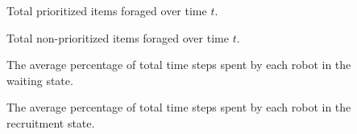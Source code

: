 \begin{description}
	\item[\parbox{\namewidth}{$E^t_P$}] Total prioritized items foraged over time $t$.	

	\item[\parbox{\namewidth}{$E^t_{NP}$}] Total non-prioritized items foraged over time $t$.	
	
	\item[\parbox{\namewidth}{$t_{wait}$}] The average percentage of total time steps spent by each robot in the waiting state.

	\item[\parbox{\namewidth}{$t_{recruitment}$}] The average percentage of total time steps spent by each robot in the recruitment state. 
	
	

\end{description}
